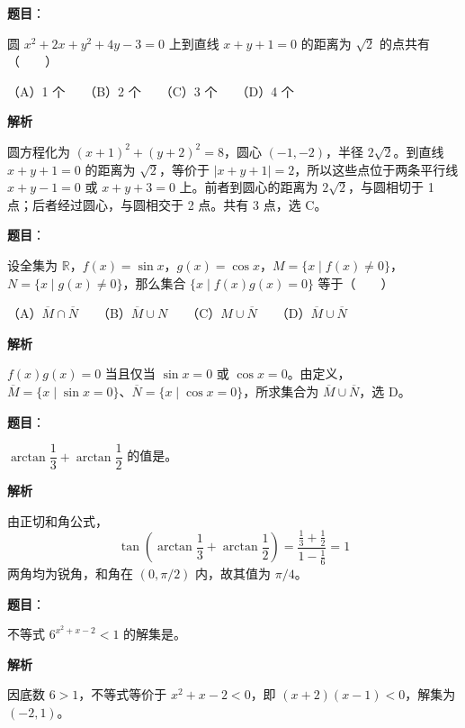 \begin{answer}

\textbf{题目}：

圆 $x^2+2x+y^2+4y-3=0$ 上到直线 $x+y+1=0$ 的距离为 $\sqrt2$ 的点共有\mbox{（　　）}

（A）1 个　　（B）2 个　　（C）3 个　　（D）4 个

\textbf{解析}

圆方程化为 $(x+1)^2+(y+2)^2=8$，圆心 $(-1,-2)$，半径 $2\sqrt2$。到直线 $x+y+1=0$ 的距离为 $\sqrt2$，等价于 $|x+y+1|=2$，所以这些点位于两条平行线 $x+y-1=0$ 或 $x+y+3=0$ 上。前者到圆心的距离为 $2\sqrt2$，与圆相切于 1 点；后者经过圆心，与圆相交于 2 点。共有 3 点，选 C。


\end{answer}
\begin{answer}

\textbf{题目}：

设全集为 $\mathbb R$，$f(x)=\sin x$，$g(x)=\cos x$，$M=\{x\mid f(x)\ne0\}$，$N=\{x\mid g(x)\ne0\}$，那么集合 $\{x\mid f(x)g(x)=0\}$ 等于\mbox{（　　）}

（A）$\overline M\cap\overline N$　　（B）$\overline M\cup N$　　（C）$M\cup\overline N$　　（D）$\overline M\cup\overline N$

\textbf{解析}

$f(x)g(x)=0$ 当且仅当 $\sin x=0$ 或 $\cos x=0$。由定义，$\overline M=\{x\mid\sin x=0\}$、$\overline N=\{x\mid\cos x=0\}$，所求集合为 $\overline M\cup\overline N$，选 D。


\end{answer}
\begin{answer}

\textbf{题目}：

$\arctan\dfrac13+\arctan\dfrac12$ 的值是\underline{\hspace{6em}}。

\textbf{解析}

由正切和角公式，
\nopagebreak[4]
\[
\tan\left(\arctan\frac13+\arctan\frac12\right)
=\frac{\frac13+\frac12}{1-\frac16}=1
\]
两角均为锐角，和角在 $(0,\pi/2)$ 内，故其值为 $\pi/4$。


\end{answer}
\begin{answer}

\textbf{题目}：

不等式 $6^{x^2+x-2}<1$ 的解集是\underline{\hspace{8em}}。

\textbf{解析}

因底数 $6>1$，不等式等价于 $x^2+x-2<0$，即 $(x+2)(x-1)<0$，解集为 $(-2,1)$。


\end{answer}

